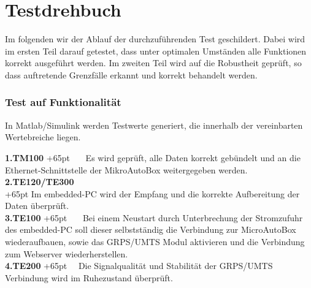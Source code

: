 \documentclass[fontsize = 12pt, paper = a4]{scrreprt}
\begin{document}








\chapter*{Testdrehbuch}
Im folgenden wir der Ablauf der durchzuführenden Test geschildert. Dabei wird im ersten Teil darauf getestet, dass unter optimalen Umständen alle Funktionen korrekt ausgeführt werden. Im zweiten Teil wird auf die Robustheit geprüft, so dass auftretende Grenzfälle erkannt und korrekt behandelt werden.


\subsection*{Test auf Funktionalität}
In Matlab/Simulink werden Testwerte generiert, die innerhalb der vereinbarten Wertebreiche liegen. 



\textbf{1.TM100}
\hangindent+65pt 
\ \ \  Es wird geprüft, alle Daten korrekt gebündelt und an die Ethernet-Schnittstelle der MikroAutoBox weitergegeben werden. \\

\textbf{2.TE120/TE300}\\
\hangindent+65pt 
Im embedded-PC wird der Empfang und die korrekte Aufbereitung der Daten überprüft.\\

\textbf{3.TE100}
\hangindent+65pt  
\ \ \ Bei einem Neustart durch Unterbrechung der Stromzufuhr des embedded-PC soll dieser selbstständig die Verbindung zur MicroAutoBox wiederaufbauen, sowie das GRPS/UMTS Modul aktivieren und die Verbindung zum Webserver wiederherstellen.\\

\textbf{4.TE200}
\hangindent+65pt  
\ \  Die Signalqualität und Stabilität der GRPS/UMTS Verbindung wird im Ruhezustand überprüft.\\
\end{document}
